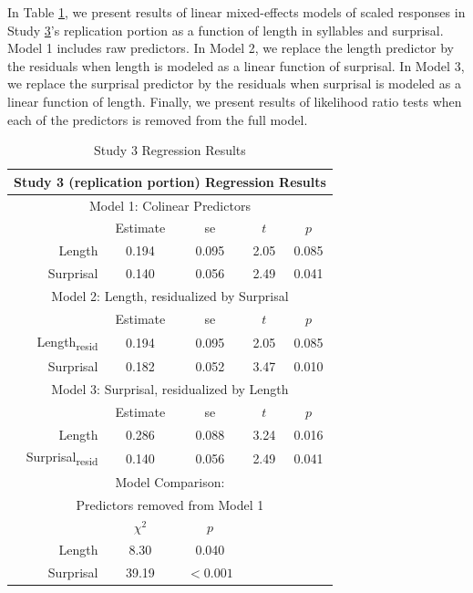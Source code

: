 \begin{appendices}


In Table \ref{table:3}, we present results of linear mixed-effects models of scaled responses in Study \hyperref[sec:study3]{3}'s replication portion as a function of length in syllables and surprisal.
Model 1 includes raw predictors.
In Model 2, we replace the length predictor by the residuals when length is modeled as a linear function of surprisal.
In Model 3, we replace the surprisal predictor by the residuals when surprisal is modeled as a linear function of length.
Finally, we present results of likelihood ratio tests when each of the predictors is removed from the full model.

\begin{table}[h]
\center
\footnotesize
\begin{tabular}{r|cccc}
\hline
\hline
\multicolumn{5}{c}{\textbf{Study 3 (replication portion) Regression Results}} \\
\hline
\hline
\multicolumn{5}{c}{Model 1: Colinear Predictors} \\
& Estimate & se & $t$ & $p$ \\
\hline
Length & 0.194 & 0.095 & 2.05 & 0.085 \\
Surprisal & 0.140 & 0.056 & 2.49 & 0.041 \\
\hline
\hline
\multicolumn{5}{c}{Model 2: Length, residualized by Surprisal} \\
& Estimate & se & $t$ & $p$ \\
\hline
Length\textsubscript{resid} & 0.194 & 0.095 & 2.05 & 0.085 \\
Surprisal & 0.182 & 0.052 & 3.47 & 0.010 \\
\hline
\hline
\multicolumn{5}{c}{Model 3: Surprisal, residualized by Length} \\
& Estimate & se & $t$ & $p$ \\
\hline
Length & 0.286 & 0.088 & 3.24 & 0.016 \\
Surprisal\textsubscript{resid} & 0.140 & 0.056 & 2.49 & 0.041 \\
\hline
\hline
\multicolumn{5}{c}{Model Comparison:} \\
\multicolumn{5}{c}{Predictors removed from Model 1} \\
& $\chi^2$ & $p$ \\
\hline
Length & 8.30 & 0.040 \\
Surprisal & 39.19 & $<0.001$ \\
\hline
\hline
\end{tabular}
\caption{Study 3 Regression Results}
\label{table:3}
\end{table}


\end{appendices}
